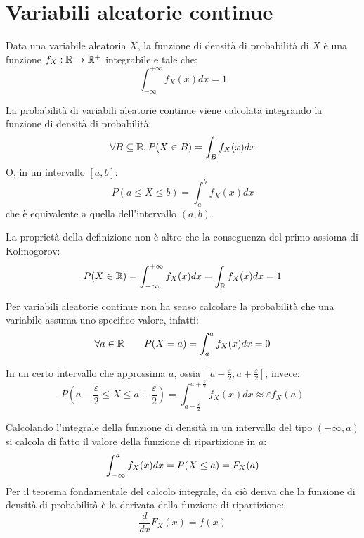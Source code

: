 \section{Variabili aleatorie continue}
\begin{defin}
	Data una variabile aleatoria $X$, la funzione di densità di probabilità di $X$ è una funzione $f_X:\mathbb R\to\mathbb R^+$ integrabile e tale che:
	\begin{equation*}
		\int_{-\infty}^{+\infty} f_X(x)dx = 1
	\end{equation*}
\end{defin}

La probabilità di variabili aleatorie continue viene calcolata integrando la funzione di densità di probabilità:
\begin{equation*}
	\forall B\subseteq\mathbb R, P(X\in B)=\int_B f_X(x)dx
\end{equation*}
O, in un intervallo $[a,b]$:
\begin{equation*}
	P(a\leq X\leq b)=\int_a^b f_X(x)dx
\end{equation*}
che è equivalente a quella dell'intervallo $(a,b)$.

La proprietà della definizione non è altro che la conseguenza del primo assioma di Kolmogorov:
\begin{equation*}
	P(X\in\mathbb R) = \int_{-\infty}^{+\infty} f_X(x)dx = \int_\mathbb R f_X(x)dx = 1
\end{equation*}

Per variabili aleatorie continue non ha senso calcolare la probabilità che una variabile assuma uno specifico valore, infatti:
\begin{equation*}
	\forall a\in\mathbb R \qquad P(X=a)=\int_a^a f_X(x)dx=0
\end{equation*}

In un certo intervallo che approssima $a$, ossia $[a-\frac{\varepsilon}{2},a+\frac{\varepsilon}{2}]$, invece:
\begin{equation*}
	P\left(a - \frac{\varepsilon}{2}\leq X\leq a + \frac{\varepsilon}{2}\right) = \int_{a - \frac{\varepsilon}{2}}^{a + \frac{\varepsilon}{2}} f_X(x)dx \approx \varepsilon f_X(a)
\end{equation*}

Calcolando l'integrale della funzione di densità in un intervallo del tipo $(-\infty,a)$ si calcola di fatto il valore della funzione di ripartizione in $a$:
\begin{equation*}
	\int_{-\infty}^a f_X(x)dx = P(X\leq a) = F_X(a) \\
\end{equation*}
Per il teorema fondamentale del calcolo integrale, da ciò deriva che la funzione di densità di probabilità è la derivata della funzione di ripartizione:
\begin{equation*}
	\frac{d}{dx}F_X(x)=f(x)
\end{equation*}

